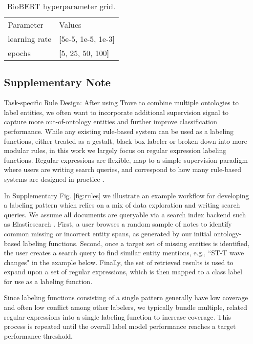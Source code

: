\documentclass{article}
\begin{document}
\begin{table}[H]
\centering
\begin{tabular}{ll} \toprule
Parameter        & Values \\
\cmidrule(lr){1-2}
learning rate    & [5e-5, 1e-5, 1e-3] \\
epochs           & [5, 25, 50, 100] \\
\bottomrule  
\end{tabular}
\caption{\label{tbl:lmgrid} BioBERT hyperparameter grid.}
\end{table}





\subsection*{Supplementary Note}

Task-specific Rule Design: After using Trove to combine multiple ontologies to label entities, we often want to incorporate additional supervision signal to capture more out-of-ontology entities and further improve classification performance. 
While any existing rule-based system can be used as a labeling functions, either treated as a gestalt, black box labeler or broken down into more modular rules, in this work  we largely focus on regular expression labeling functions.
Regular expressions are flexible, map to a simple supervision paradigm where users are writing search queries, and correspond to how many rule-based systems are designed in practice \cite{Fu2020-hh}.

In Supplementary Fig. \ref{fig:rules} we illustrate an example workflow for developing a labeling pattern which relies on a mix of data exploration and writing search queries.  
We assume all documents are queryable via a search index backend such as Elasticsearch \cite{gormley2015elasticsearch}. First, a user browses a random sample of notes to identify common missing or incorrect entity spans, as generated by our initial ontology-based labeling functions. 
Second, once a target set of missing entities is identified, the user creates a search query to find similar entity mentions, e.g., ``ST-T wave changes" in the example below. 
Finally, the set of retrieved results is used to expand upon a set of regular expressions, which is then mapped to a class label for use as a labeling function.

Since labeling functions consisting of a single pattern generally have low coverage and often low conflict among other labelers, we typically bundle multiple, related regular expressions into a single labeling function to increase coverage. 
This process is repeated until the overall label model performance reaches a target performance threshold. 
\end{document}
